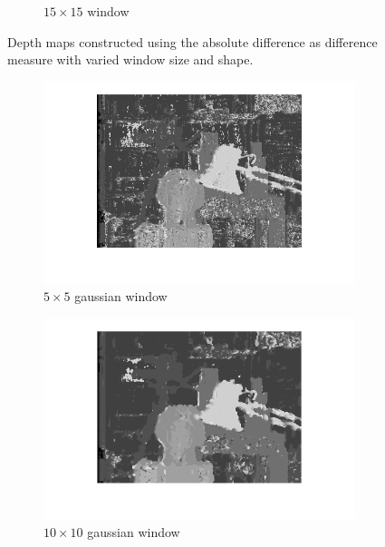 \documentclass{article}
\begin{document}
\begin{figure}[ht!]
\begin{subfigure}{.3\textwidth}
  \caption{$15\times15$ window}
  \label{fig_a3g}
 \end{subfigure}
 \caption{Depth maps constructed using the absolute difference as difference measure with varied window size and shape.}
 \label{fig_a}
\end{figure}

\begin{figure}[ht!]
 \centering
 \begin{subfigure}{.3\textwidth}
  \centering
  \includegraphics[width=\linewidth]{ex3/s5_5g.png}
  \caption{$5\times5$ gaussian window}
  \label{fig_s1}
 \end{subfigure}
 \begin{subfigure}{.3\textwidth}
  \centering
  \includegraphics[width=\linewidth]{ex3/s10_10g.png}
  \caption{$10\times10$ gaussian window}
  \label{fig_s2}
 \end{subfigure}
 \begin{subfigure}{.3\textwidth}

\end{subfigure}
\end{figure}
\end{document}
